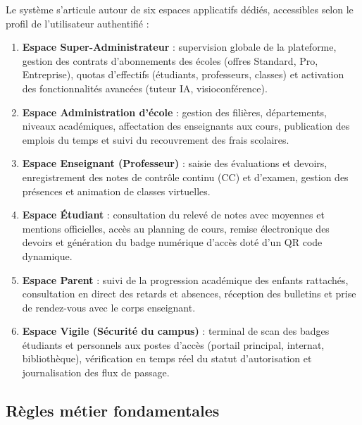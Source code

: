 Le système s'articule autour de six espaces applicatifs dédiés, accessibles selon le profil de l'utilisateur authentifié :
\begin{enumerate}
    \item \textbf{Espace Super-Administrateur} : supervision globale de la plateforme, gestion des contrats d'abonnements des écoles (offres Standard, Pro, Entreprise), quotas d'effectifs (étudiants, professeurs, classes) et activation des fonctionnalités avancées (tuteur IA, visioconférence).
    \item \textbf{Espace Administration d'école} : gestion des filières, départements, niveaux académiques, affectation des enseignants aux cours, publication des emplois du temps et suivi du recouvrement des frais scolaires.
    \item \textbf{Espace Enseignant (Professeur)} : saisie des évaluations et devoirs, enregistrement des notes de contrôle continu (CC) et d'examen, gestion des présences et animation de classes virtuelles.
    \item \textbf{Espace Étudiant} : consultation du relevé de notes avec moyennes et mentions officielles, accès au planning de cours, remise électronique des devoirs et génération du badge numérique d'accès doté d'un QR code dynamique.
    \item \textbf{Espace Parent} : suivi de la progression académique des enfants rattachés, consultation en direct des retards et absences, réception des bulletins et prise de rendez-vous avec le corps enseignant.
    \item \textbf{Espace Vigile (Sécurité du campus)} : terminal de scan des badges étudiants et personnels aux postes d'accès (portail principal, internat, bibliothèque), vérification en temps réel du statut d'autorisation et journalisation des flux de passage.
\end{enumerate}

\subsection{Règles métier fondamentales}

